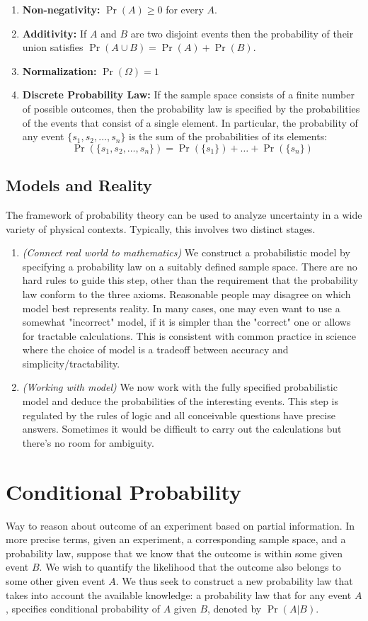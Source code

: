 \begin{enumerate}
    \item \textbf{Non-negativity:} $\Pr(A)\ge 0$ for every $A$.
    \item \textbf{Additivity:} If $A$ and $B$ are two disjoint events then the probability of their union satisfies $\Pr(A \cup B)=\Pr(A)+\Pr(B)$.
    \item \textbf{Normalization:} $\Pr(\Omega)=1$
    \item \textbf{Discrete Probability Law:} If the sample space consists of a finite number of possible outcomes, then the probability law is specified by the  probabilities of the events that consist of a single element.  In particular, the probability of any event $\{s_1, s_2, \dots, s_n\}$ is the sum of the probabilities of its elements:
    \[ \Pr(\{s_1, s_2, \dots, s_n\}) = \Pr(\{s_1\}) + \dots + \Pr(\{s_n \}) \]
\end{enumerate}

\subsection{Models and Reality}
The framework of probability theory can be  used to  analyze uncertainty in  a wide variety of physical contexts. Typically, this involves two distinct stages. 
\begin{enumerate}
    \item \textit{(Connect real world to mathematics)} We  construct a probabilistic model by specifying a prob­ability  law on a suitably defined  sample space. There are no hard rules to guide this step, other than  the  requirement that the probability law con­form to the three axioms. Reasonable people may disagree on which model best represents reality. In many cases, one may even want to use a some­what "incorrect"  model, if it is simpler than  the "correct" one or allows for tractable calculations. This is consistent with common practice in science where the choice of model is a tradeoff between accuracy and simplicity/tractability.
    \item \textit{(Working with model)} We now work with the fully specified probabilistic model and deduce the probabilities of the interesting events. This step is regulated by the rules of logic and all conceivable questions have precise answers. Sometimes it would be difficult to carry out the calculations but there's no room for ambiguity.
\end{enumerate}

\section{Conditional Probability}
Way to reason about outcome of an experiment based on partial information. In more precise terms, given an experiment, a corresponding sample space, and a probability law, suppose that we know  that the outcome is within some given event $B$. We wish to quantify the likelihood that  the outcome also belongs to some other  given event $A$. We thus  seek to construct a  new probability law that takes into account the available knowledge: a probability law that for any event $A$, specifies conditional probability of $A$ given $B$, denoted by $\Pr(A|B)$.

